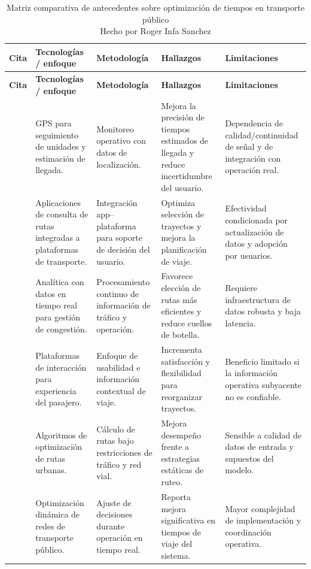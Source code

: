\setlength{\LTleft}{0pt}
\setlength{\LTright}{0pt}
\renewcommand{\arraystretch}{1.15}
\footnotesize
\begin{longtable}{|p{}|p{}|p{}|p{}|p{}|}
\caption{Matriz comparativa de antecedentes sobre optimización de tiempos en transporte público\\Hecho por Roger Infa Sanchez} \\
\hline
\textbf{Cita} & \textbf{Tecnologías / enfoque} & \textbf{Metodología} & \textbf{Hallazgos} & \textbf{Limitaciones} \\
\hline
\endfirsthead
\hline
\textbf{Cita} & \textbf{Tecnologías / enfoque} & \textbf{Metodología} & \textbf{Hallazgos} & \textbf{Limitaciones} \\
\hline
\endhead
[1] & GPS para seguimiento de unidades y estimación de llegada. & Monitoreo operativo con datos de localización. & Mejora la precisión de tiempos estimados de llegada y reduce incertidumbre del usuario. & Dependencia de calidad/continuidad de señal y de integración con operación real. \\
\hline
[2] & Aplicaciones de consulta de rutas integradas a plataformas de transporte. & Integración app--plataforma para soporte de decisión del usuario. & Optimiza selección de trayectos y mejora la planificación de viaje. & Efectividad condicionada por actualización de datos y adopción por usuarios. \\
\hline
[3] & Analítica con datos en tiempo real para gestión de congestión. & Procesamiento continuo de información de tráfico y operación. & Favorece elección de rutas más eficientes y reduce cuellos de botella. & Requiere infraestructura de datos robusta y baja latencia. \\
\hline
[4] & Plataformas de interacción para experiencia del pasajero. & Enfoque de usabilidad e información contextual de viaje. & Incrementa satisfacción y flexibilidad para reorganizar trayectos. & Beneficio limitado si la información operativa subyacente no es confiable. \\
\hline
[5] & Algoritmos de optimización de rutas urbanas. & Cálculo de rutas bajo restricciones de tráfico y red vial. & Mejora desempeño frente a estrategias estáticas de ruteo. & Sensible a calidad de datos de entrada y supuestos del modelo. \\
\hline
[6] & Optimización dinámica de redes de transporte público. & Ajuste de decisiones durante operación en tiempo real. & Reporta mejora significativa en tiempos de viaje del sistema. & Mayor complejidad de implementación y coordinación operativa. \\

\end{longtable}
